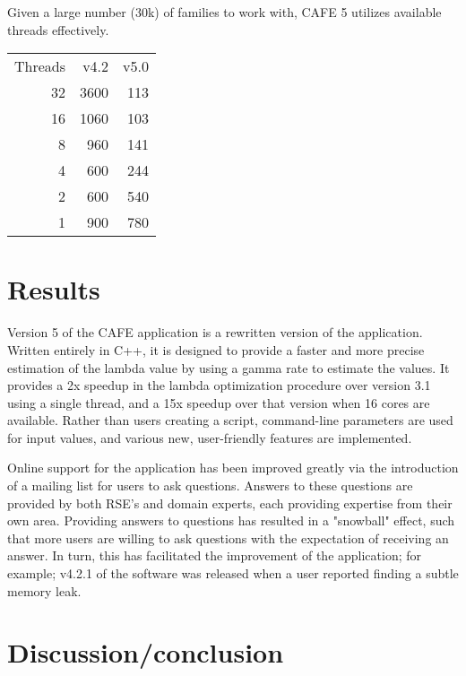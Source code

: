 \documentclass[acmtog, authorversion]{acmart}
\begin{document}
Given a large number (30k) of families to work with, CAFE 5 utilizes 
available threads effectively.

\begin{tabular}{ r r r }
  Threads & v4.2 & v5.0 \\
  32 & 3600 & 113 \\
  16 & 1060 & 103 \\
  8 & 960 & 141 \\
  4 & 600 & 244    \\
  2 & 600 & 540    \\
  1 & 900 & 780
\end{tabular}

  
\section{Results}
    Version 5 of the CAFE application is a rewritten version of the application. Written entirely in C++, it is designed to provide a faster and more precise estimation of the lambda value by using a gamma rate to estimate the values. It provides a 2x speedup in the lambda optimization procedure over version 3.1 using a single thread, and a 15x speedup over that version when 16 cores are available. Rather than users creating a script, command-line parameters are used for input values, and various new, user-friendly features are implemented.
    
    Online support for the application has been improved greatly via the introduction of a mailing list for users to ask questions. Answers to these questions are provided by both RSE's and domain experts, each providing expertise from their own area. Providing answers to questions has resulted in a "snowball" effect, such that more users are willing to ask questions with the expectation of receiving an answer. In turn, this has facilitated the improvement of the application; for example; v4.2.1 of the software was released when a user reported finding a subtle memory leak.
    
    

\section{Discussion/conclusion}
\end{document}
